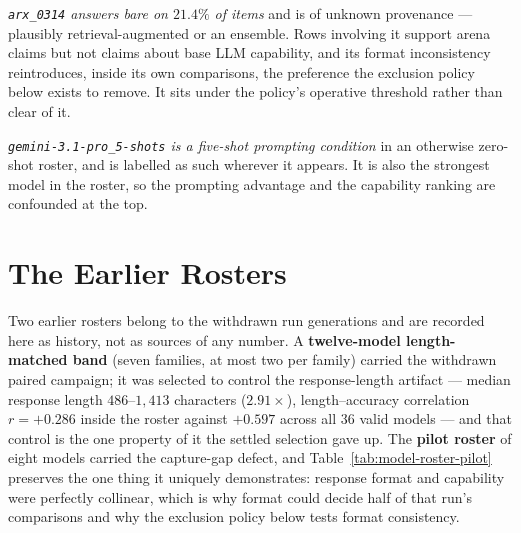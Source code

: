\emph{\texttt{arx\_0314} answers bare on $21.4\%$ of items} and is of unknown
provenance --- plausibly retrieval-augmented or an ensemble. Rows involving it
support arena claims but not claims about base LLM capability, and its
format inconsistency reintroduces, inside its own comparisons, the preference
the exclusion policy below exists to remove. It sits under the policy's
operative threshold rather than clear of it.

\emph{\texttt{gemini-3.1-pro\_5-shots} is a five-shot prompting condition} in an
otherwise zero-shot roster, and is labelled as such wherever it appears. It is
also the strongest model in the roster, so the prompting advantage and the
capability ranking are confounded at the top.

\section{The Earlier Rosters}\label{sec:roster-earlier}

Two earlier rosters belong to the withdrawn run generations and are
recorded here as history, not as sources of any number. A
\textbf{twelve-model length-matched band} (seven families, at most two
per family) carried the withdrawn paired campaign; it was selected to
control the response-length artifact --- median response length
$486$--$1{,}413$ characters ($2.91\times$), length--accuracy
correlation $r = +0.286$ inside the roster against $+0.597$ across all
$36$ valid models --- and that control is the one property of it the
settled selection gave up. The \textbf{pilot roster} of eight models
carried the capture-gap defect, and Table~\ref{tab:model-roster-pilot}
preserves the one thing it uniquely demonstrates: response format and
capability were perfectly collinear, which is why format could decide
half of that run's comparisons and why the exclusion policy below
tests format consistency.

